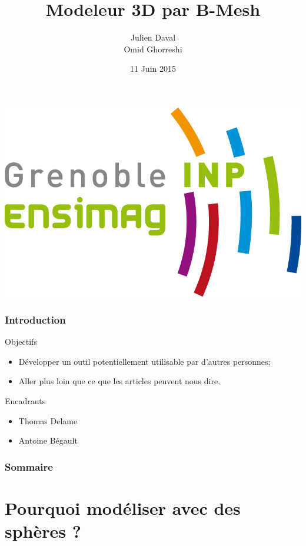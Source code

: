 \documentclass[9pt]{beamer}
\title{Modeleur 3D par B-Mesh}
\author{Julien Daval \\ Omid Ghorreshi}
\institute[Ensimag 2A]{2ème année Ensimag}
\date{11 Juin 2015}
\begin{document}
\begin{frame}
	\titlepage
	\begin{center}
		\includegraphics[scale=0.3]{images/ensimag.jpg}	
	\end{center}

\end{frame}

\begin{frame}
	\frametitle{Introduction}

	\begin{block}{Objectifs}
		\begin{itemize}
			\item Développer un outil potentiellement utilisable par d'autres personnes;
			\item Aller plus loin que ce que les articles peuvent nous dire.
		\end{itemize}			
	\end{block}
	
	\begin{block}{Encadrants}
		\begin{itemize}
			\item Thomas Delame
			\item Antoine Bégault
		\end{itemize}
	\end{block}
\end{frame}


\begin{frame}
	\frametitle{Sommaire}
	\tableofcontents
\end{frame}

\section{Pourquoi modéliser avec des sphères ?}
\end{document}

